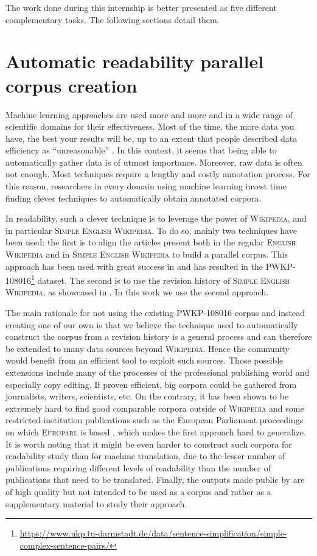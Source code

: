 \documentclass[a4paper, 11pt, onepage]{scrreprt}
\newcommand\wiki{\textsc{Wikipedia}}
\newcommand\ew{\textsc{English Wikipedia}}
\newcommand\sew{\textsc{Simple English Wikipedia}}
\begin{document}
The work done during this internship is better presented as five
different complementary tasks. The following sections detail them.

\section{Automatic readability parallel corpus creation}
\label{sec:corpus}

Machine learning approaches are used more and more and in a wide range
of scientific domains for their effectiveness. Most of the time, the
more data you have, the best your results will be, up to an extent
that people described data efficiency as “unreasonable”
\cite{halevy2009unreasonable}. In this context, it seems that being
able to automatically gather data is of utmost importance. Moreover,
raw data is often not enough. Most techniques require a lengthy and
costly annotation process. For this reason, researchers in every
domain using machine learning invest time finding clever techniques to
automatically obtain annotated corpora.

In readability, such a clever technique is to leverage the power of
\wiki, and in particular \sew. To do so, mainly two techniques have
been used: the first is to align the articles present both in the
regular \ew{} and in \sew{} to build a parallel corpus. This approach
has been used with great success in \cite{zhu2010monolingual} and has
resulted in the
\textsc{PWKP-108016}\footnote{\url{https://www.ukp.tu-darmstadt.de/data/sentence-simplification/simple-complex-sentence-pairs/}}
dataset. The second is to use the revision history of \sew, as
showcased in \cite{yatskar2010sake}. In this work we use the second
approach.

The main rationale for not using the existing \textsc{PWKP-108016}
corpus and instead creating one of our own is that we believe the
technique used to automatically construct the corpus from a revision
history is a general process and can therefore be extended to many
data sources beyond \wiki. Hence the community would benefit from an
efficient tool to exploit such sources. Those possible extensions
include many of the processes of the professional publishing world and
especially copy editing. If proven efficient, big corpora could be
gathered from journalists, writers, scientists, etc. On the contrary,
it has been shown to be extremely hard to find good comparable corpora
outside of \wiki{} and some restricted institution publications such
as the European Parliament proceedings on which \textsc{Europarl} is
based \cite{koehn2005europarl}, which makes the first approach hard to
generalize. It is worth noting that it might be even harder to
construct such corpora for readability study than for machine
translation, due to the lesser number of publications requiring
different levels of readability than the number of publications that
need to be translated. Finally, the outputs made public by
\cite{yatskar2010sake} are of high quality but not intended to be used
as a corpus and rather as a supplementary material to study their
approach.
\end{document}
